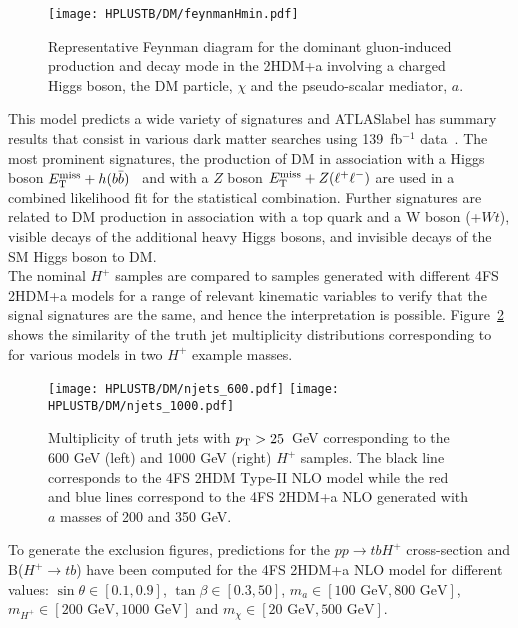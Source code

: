 \begin{figure}[htb]
    \RawFloats
    \centering
    \texttt{[image: HPLUSTB/DM/feynmanHmin.pdf]}
    \caption{Representative Feynman diagram for the dominant gluon-induced production and decay mode in the 2HDM+a involving a charged Higgs boson, the DM particle, $\chi$ and the pseudo-scalar mediator, $a$.}
    \label{Hplustb:2hdmafeynman}
\end{figure}

This model predicts a wide variety of signatures and \acrshort{ATLASlabel} has summary results that consist in various dark matter searches using 139~fb$^{-1}$ data~\cite{Hpluscomb}. The most prominent signatures, the production of DM in association with a Higgs boson $E_{\text{T}}^{\text{miss}}+h(b\bar{b})$~\cite{2108.13391} and with a $Z$ boson $E_{\text{T}}^{\text{miss}}+Z(\ell^+\ell^-)$ are used in a combined likelihood fit for the statistical combination. Further signatures are related to DM production in association with a top quark and a W boson (\MET+$Wt$), visible decays of the additional heavy Higgs bosons, and invisible decays of the SM Higgs boson to DM.\\

The nominal $H^+$ samples are compared to samples generated with different 4FS 2HDM+a models for a range of relevant kinematic variables to verify that the signal signatures are the same, and hence the interpretation is possible. Figure~\ref{Hplustb:2hdmatruth} shows the similarity of the truth jet multiplicity distributions corresponding to for various models in two $H^+$ example masses.\\

\begin{figure}[htb]
    \RawFloats
    \centering
    \texttt{[image: HPLUSTB/DM/njets\_600.pdf]}
    \texttt{[image: HPLUSTB/DM/njets\_1000.pdf]}
    \caption{Multiplicity of truth jets with $p_{\text{T}}>25$~GeV corresponding to the 600 GeV (left) and 1000 GeV (right) $H^+$ samples. The black line corresponds to the 4FS 2HDM Type-II NLO model while the red and blue lines correspond to the 4FS 2HDM+a NLO generated with $a$ masses of 200 and 350 GeV.}
    \label{Hplustb:2hdmatruth}
\end{figure}

To generate the exclusion figures, predictions for the $pp\to tbH^+$ cross-section and B($H^+\to tb$) have been computed for the 4FS 2HDM+a NLO model for different values: $\sin\theta\in[0.1,0.9]$, $\tan\beta\in[0.3,50]$, $m_a\in[100\text{ GeV},800\text{ GeV}]$, $m_{H^+}\in[200\text{ GeV},1000\text{ GeV}]$ and $m_\chi\in[20\text{ GeV},500\text{ GeV}]$.\\

